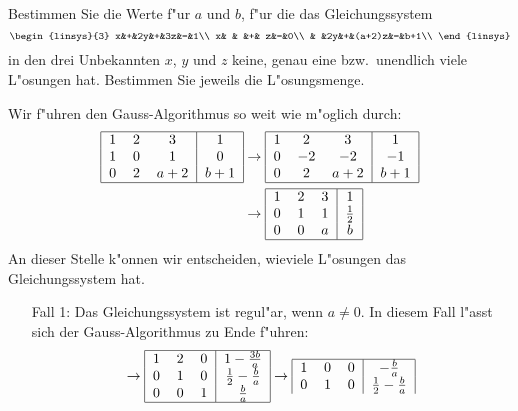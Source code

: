 Bestimmen Sie die Werte f"ur $a$ und $b$, f"ur die das Gleichungssystem
\[
\begin{linsys}{3}
x&+&2y&+&3z&=&1\\
x& &  &+& z&=&0\\
 & &2y&+&(a+2)z&=&b+1\\
\end{linsys}
\]
in den drei Unbekannten $x$, $y$ und $z$ keine, genau eine bzw.~unendlich
viele L"osungen hat. Bestimmen Sie jeweils die L"osungsmenge.

\begin{loesung}
Wir f"uhren den Gauss-Algorithmus so weit wie m"oglich durch:
\begin{align*}
\begin{tabular}{|ccc|c|}
\hline
1&2&3&1\\
1&0&1&0\\
0&2&$a+2$&$b+1$\\
\hline
\end{tabular}
&\rightarrow
\begin{tabular}{|ccc|c|}
\hline
1&2&3&1\\
0&$-2$&$-2$&$-1$\\
0&2&$a+2$&$b+1$\\
\hline
\end{tabular}
\\
&\rightarrow
\begin{tabular}{|ccc|c|}
\hline
1&2&3&1\\
0&1&1&$\frac12$\\
0&0&$a$&$b$\\
\hline
\end{tabular}
\end{align*}
An dieser Stelle k"onnen wir entscheiden, wieviele L"osungen das Gleichungssystem
hat.
\begin{enumerate}
\item[Fall 1:]
Das Gleichungssystem ist regul"ar, wenn $a\ne 0$. In diesem Fall l"asst sich der
Gauss-Algorithmus zu Ende f"uhren:
\[
\rightarrow
\begin{tabular}{|ccc|c|}
\hline
1&2&0&$1-\frac{3b}{a}$\\
0&1&0&$\frac12-\frac{b}{a}$\\
0&0&1&$\frac{b}{a}$\\
\hline
\end{tabular}
\rightarrow
\begin{tabular}{|ccc|c|}
\hline
1&0&0&$-\frac{b}{a}$\\
0&1&0&$\frac12-\frac{b}{a}$\\

\end{tabular}\]
\end{enumerate}
\end{loesung}
